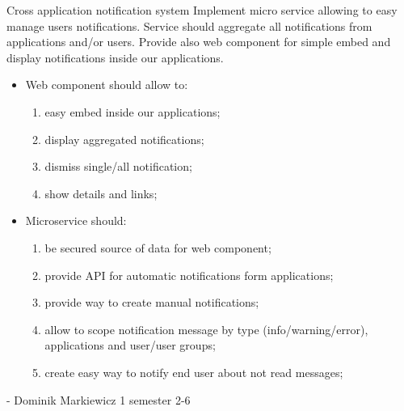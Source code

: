 \begin{project}
{Cross application notification system}
{Implement micro service allowing to easy manage users notifications. Service should aggregate all notifications from applications and/or users. Provide also web component for simple embed and display notifications inside our applications.} 
{
\begin{itemize}
	\item Web component should allow to:
		\begin{enumerate}
			\item easy embed inside our applications;
			\item display aggregated notifications;
			\item dismiss single/all notification;
			\item show details and links;
		\end{enumerate}
	\item Microservice should:
		\begin{enumerate}
			\item be secured source of data for web component;
			\item provide API for automatic notifications form applications;
			\item provide way to create manual notifications;
			\item allow to scope notification message by type (info/warning/error), applications and user/user groups;
			\item create easy way to notify end user about not read messages;
		\end{enumerate}
\end{itemize}
}
{-}
{Dominik Markiewicz}
{1 semester}
{2-6}
\end{project}
